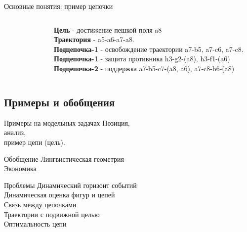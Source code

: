\begin{frame}{Основные понятия: пример цепочки}
\begin{columns}
\begin{figure}[t]
  \centering
\end{figure}
\textbf{Цель} - достижение пешкой поля a8 \\
\textbf{Траектория} - a5-a6-a7-a8. \\
\pause
\textbf{Подцепочка-1} - освобождение траектории a7-b5, a7-c6, a7-c8. \\
\pause
\textbf{Подцепочка-1} - защита противника h3-g2-(a8), h3-f1-(a6) \\
\pause
\textbf{Подцепочка-2} - поддержка a7-b5-c7-(a8, a6), a7-c8-b6-(a8)
\end{columns}
\end{frame}


\subsection{Примеры и обобщения}
\begin{frame}{Примеры на модельных задачах} %
Позиция, \\
анализ, \\ 
пример цепи (цель). 
\end{frame}

\begin{frame}{Обобщение}
Лингвистическая геометрия \\
Экономика
\end{frame}

\begin{frame}{Проблемы} %
Динамический горизонт событий \\
Динамическая оценка фигур и цепей \\
Связь между цепочками \\
Траектории с подвижной целью \\
Оптимальность цепи
\end{frame}

